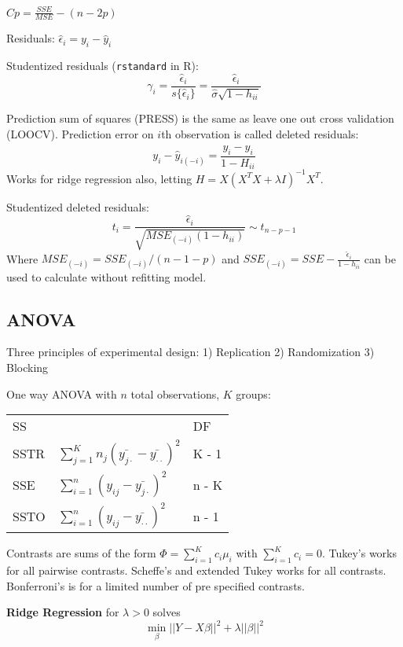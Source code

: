 \documentclass[10pt, twocolumn]{article}
\begin{document}
$Cp = \frac{SSE}{MSE} - (n - 2p)$

Residuals: $\hat{\epsilon}_i = y_i - \hat{y}_i$

Studentized residuals (\texttt{rstandard} in R): 
\[
    \gamma_i =
    \frac{\hat{\epsilon}_i}{ s \{ \hat{\epsilon}_i \} } = 
    \frac{\hat{\epsilon}_i}{\hat{\sigma} \sqrt{1 - h_{ii}}}
\]

Prediction sum of squares (PRESS) is the same as leave one out cross
validation (LOOCV). Prediction error on $i$th observation is called deleted
residuals:
\[
    y_i - \hat{y}_{i (-i)} = \frac{y_i - \hat{y}_i}{1 - H_{ii}}
\]
Works for ridge regression also, letting 
$H = X(X^T X + \lambda I)^{-1} X^T$.

Studentized deleted residuals: 
\[
    t_i = \frac{\hat{\epsilon}_i}{\sqrt{MSE_{(-i)} (1 - h_{ii})}} \sim t_{n - p -1}
\]
Where $MSE_{(-i)} = SSE_{(-i)} / (n - 1 - p)$ and
$SSE_{(-i)} = SSE - \frac{\hat{\epsilon}_i}{1 - h_{ii}}$ can be used to
calculate without refitting model.

\subsection*{ANOVA}

Three principles of experimental design: 1) Replication 2) Randomization 3)
Blocking

One way ANOVA with $n$ total observations, $K$ groups:

{
\centering
\begin{tabular}{lll}
    SS   &  & DF     \\
    SSTR & $\sum_{j=1}^K n_j (\bar{y_{j \cdot}} - \bar{y_{\cdot \cdot}})^2$  & K - 1 \\
    SSE  & $\sum_{i=1}^n (y_{ij} - \bar{y_{j \cdot}})^2$  & n - K \\
    SSTO & $\sum_{i=1}^n (y_{ij} - \bar{y_{\cdot \cdot}})^2$  & n - 1 
\end{tabular}
}

Contrasts are sums of the form $\Phi = \sum_{i=1}^K c_i \mu_i$ with
$\sum_{i=1}^K c_i = 0$.
Tukey's works for all pairwise contrasts.
Scheffe's and extended Tukey works for all contrasts.
Bonferroni's is for a limited number of pre specified contrasts.

\textbf{Ridge Regression} for $\lambda > 0$ solves
\[
    \min_\beta ||Y - X\beta||^2 + \lambda ||\beta||^2
\]

\newpage
\end{document}
